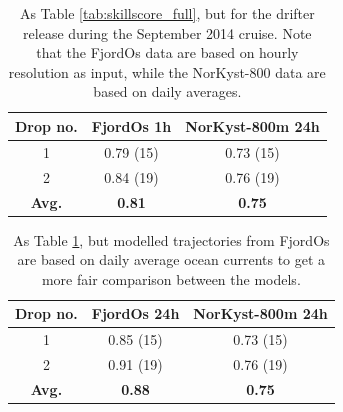 \begin{table}[htb]
	\begin{center}
  		\begin{tabular}{ | c | c | c |}
    		\hline
    		{\bf \small Drop no.} & {\bf \small FjordOs 1h} & {\bf \small NorKyst-800m 24h} \\ \hline
    		\small 1 & \small 0.79 (15) & \small 0.73 (15) \\ 
    		\small 2 & \small 0.84 (19) & \small 0.76 (19) \\ \hline
    		{\bf \small Avg.} & {\bf \small 0.81} & {\bf \small 0.75} \\
    		\hline
  	\end{tabular}
	\caption{\small As Table \ref{tab:skillscore_full}, but for the drifter release during the September 2014 cruise. Note that the FjordOs data are based on hourly resolution as input, while the NorKyst-800 data are based on daily averages.}
	\label{tab:skillscore2014_1h}
	\end{center}
\end{table}

\begin{table}[htb]
	\begin{center}
  		\begin{tabular}{ | c | c | c |}
    			\hline
    			{\bf \small Drop no.} & {\bf \small FjordOs 24h} & {\bf \small NorKyst-800m 24h} \\ \hline
    			\small 1 & \small 0.85 (15) & \small 0.73 (15) \\ 
    			\small 2 & \small 0.91 (19) & \small 0.76 (19) \\ \hline
    			{\bf \small Avg.} & {\bf \small 0.88} & {\bf \small 0.75} \\
    			\hline
  		\end{tabular}
		\caption{\small As Table \ref{tab:skillscore2014_1h}, but modelled trajectories from FjordOs are based on daily average ocean currents to get a more fair comparison between the models.}
		\label{tab:skillscore2014_24h}
	\end{center}
\end{table}

